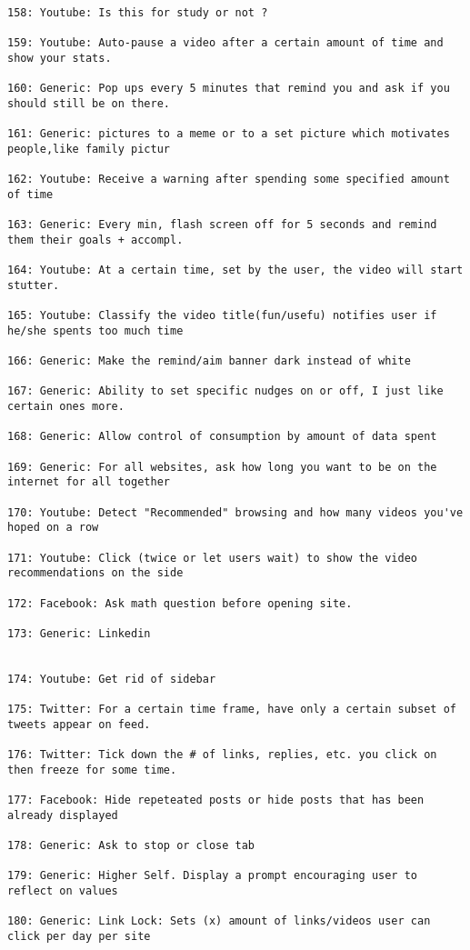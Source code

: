 \begin{lstlisting}[breaklines]
158: Youtube: Is this for study or not ?

159: Youtube: Auto-pause a video after a certain amount of time and show your stats.

160: Generic: Pop ups every 5 minutes that remind you and ask if you should still be on there.

161: Generic: pictures to a meme or to a set picture which motivates people,like family pictur

162: Youtube: Receive a warning after spending some specified amount of time

163: Generic: Every min, flash screen off for 5 seconds and remind them their goals + accompl.

164: Youtube: At a certain time, set by the user, the video will start stutter.

165: Youtube: Classify the video title(fun/usefu) notifies user if he/she spents too much time

166: Generic: Make the remind/aim banner dark instead of white

167: Generic: Ability to set specific nudges on or off, I just like certain ones more.

168: Generic: Allow control of consumption by amount of data spent

169: Generic: For all websites, ask how long you want to be on the internet for all together

170: Youtube: Detect "Recommended" browsing and how many videos you've hoped on a row

171: Youtube: Click (twice or let users wait) to show the video recommendations on the side

172: Facebook: Ask math question before opening site.

173: Generic: Linkedin


174: Youtube: Get rid of sidebar

175: Twitter: For a certain time frame, have only a certain subset of tweets appear on feed.

176: Twitter: Tick down the # of links, replies, etc. you click on then freeze for some time.

177: Facebook: Hide repeteated posts or hide posts that has been already displayed

178: Generic: Ask to stop or close tab

179: Generic: Higher Self. Display a prompt encouraging user to reflect on values

180: Generic: Link Lock: Sets (x) amount of links/videos user can click per day per site


\end{lstlisting}
